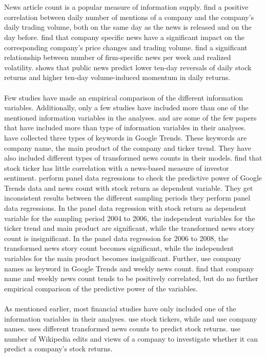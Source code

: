 \\\\
News article count is a popular measure of information supply. \cite{preis2013} find a positive correlation between daily number of mentions of a company and the company's daily trading volume, both on the same day as the news is released and on the day before. \cite{ryan} find that company specific news have a significant impact on the corresponding company's price changes and trading volume. \cite{vlastakis} find a significant relationship between number of firm-specific news per week and realized volatility. \cite{tetlock} shows that public news predict lower ten-day reversals of daily stock returns and higher ten-day volume-induced momentum in daily returns. 
\\\\
Few studies have made an empirical comparison of the different information variables. Additionally, only a few studies have included more than one of the mentioned information variables in the analyses. \cite{vlastakis} and \cite{engelberg} are some of the few papers that have included more than type of information variables in their analyses. \cite{engelberg} have collected three types of keywords in Google Trends. These keywords are company name, the main product of the company and ticker trend. They have also included different types of transformed news counts in their models. \cite{engelberg} find that stock ticker has little correlation with a news-based measure of investor sentiment. \cite{engelberg} perform panel data regressions to check the predictive power of Google Trends data and news count with stock return as dependent variable. They get inconsistent results between the different sampling periods they perform panel data regressions. In the panel data regression with stock return as dependent variable for the sampling period 2004 to 2006, the independent variables for the ticker trend and main product are significant, while the transformed news story count is insignificant. In the panel data regression for 2006 to 2008, the transformed news story count becomes significant, while the independent variables for the main product becomes insignificant. Further, \cite{vlastakis} use company names as keyword in Google Trends and weekly news count. \cite{vlastakis} find that company name and weekly news count tends to be positively correlated, but do no further empirical comparison of the predictive power of the variables. 
\\\\
As mentioned earlier, most financial studies have only included one of the information variables in their analyses. \cite{joseph} use stock tickers, while \cite{neri} and \cite{bijl} use company names. \cite{tetlock} uses different transformed news counts to predict stock returns. \cite{moat} use number of Wikipedia edits and views of a company to investigate whether it can predict a company's stock returns.  
